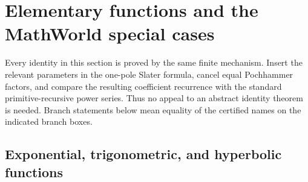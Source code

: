 \section{Elementary functions and the MathWorld special cases}\label{sec:elementary-cases}

Every identity in this section is proved by the same finite mechanism.  Insert
the relevant parameters in the one-pole Slater formula, cancel equal
Pochhammer factors, and compare the resulting coefficient recurrence with the
standard primitive-recursive power series.  Thus no appeal to an abstract
identity theorem is needed.  Branch statements below mean equality of the
certified names on the indicated branch boxes.

\subsection{Exponential, trigonometric, and hyperbolic functions}

